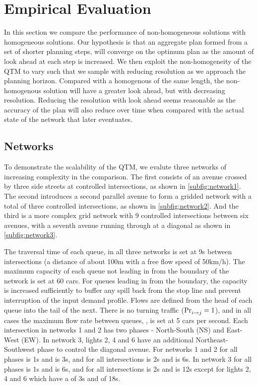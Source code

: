 
\section{Empirical Evaluation}
  
In this section we compare the performance of non-homogeneous solutions 
with homogeneous solutions. Our hypothesis is that an aggregate plan formed 
from a set of shorter planning steps, will 
converge on the optimum plan as the amount of look ahead at each step is 
increased. We then exploit the non-homogeneity of the QTM to vary \vecDT 
such that we sample with reducing 
resolution as we approach the planning horizon. Compared with a homogenous 
 \vecDT of the same length, the non-homogenous solution will have a greater 
look ahead, but with decreasing resolution. Reducing the resolution with look 
ahead seems 
reasonable as the accuracy of the plan will also reduce over time when 
compared with the actual state of the network 
that later eventuates. 

\subsection{Networks}

To demonstrate the scalability of the QTM, we evalute three networks of 
increasing complexity
in the comparison. The first consists of an avenue crossed by three 
side streets at controlled intersections, as shown in \cref{subfig:network1}. The 
second introduces a second
parallel avenue to form a gridded network with a total of three controlled
intersections, as shown in \cref{subfig:network2}. And the third is a more 
complex
grid network with 9 controlled intersections between six avenues, with a 
seventh avenue running through at a diagonal as shown in 
\cref{subfig:network3}.

The traversal time of each queue, \QDELAY{} in all three networks is set at 9s 
between intersections (a distance of about 100m with a free flow speed of
50km/h). The maximum capacity of each queue not leading in from the 
boundary of the network
is set at 60 cars. For queues leading in from the boundary, the capacity is 
increased sufficiently
to buffer any spill back from the stop line and prevent interruption of the input 
demand profile.
Flows are defined from the head of each queue into the
tail of the next. There is no turning traffic ($\mathrm{Pr}_{i\to j}^{\mathrm{}}=1$), and in all cases 
the
maximum flow rate between queues, ,  is set at 5 cars per second. 
Each 
intersection in networks 1 and 2 has
two phases - North-South (NS) and East-West (EW). In network 3, lights 2, 4 
and 6 have an
additional Northeast-Southwest phase to control the diagonal avenue. For 
networks 1 and 2 for all phases \PTMIN{}{} is 1s
and \PTMAX{}{} is 3s, and for all intersections \CTMIN{}{} is 2s and \CTMAX{}{} 
is 6s. In network 3 for all phases \PTMIN{}{} is 1s
and \PTMAX{}{} is 6s, and for all intersections \CTMIN{}{} is 2s and \CTMAX{}{} 
is 12s except for lights 2, 4 and 6 which have a \CTMIN{}{} of 3s and \CTMAX{}
{} of 18s.


